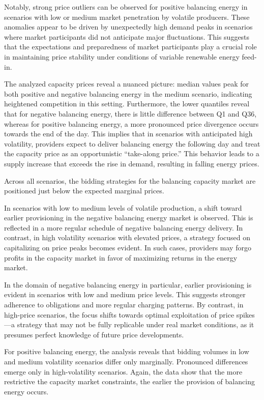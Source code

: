 Notably, strong price outliers can be observed for positive balancing energy in scenarios with low or medium market penetration
by volatile producers. These anomalies appear to be driven by unexpectedly high demand peaks in scenarios where market participants
did not anticipate major fluctuations. This suggests that the expectations and preparedness of market participants play a crucial
role in maintaining price stability under conditions of variable renewable energy feed-in.

The analyzed capacity prices reveal a nuanced picture: median values peak for both positive and negative balancing energy
in the medium scenario, indicating heightened competition in this setting.
Furthermore, the lower quantiles reveal that for
negative balancing energy, there is little difference between Q1 and Q36, whereas for positive balancing energy,
a more pronounced price divergence occurs towards the end of the day. This implies that in scenarios with anticipated high volatility,
providers expect to deliver balancing energy the following day and treat the capacity price as an opportunistic “take-along price.”
This behavior leads to a supply increase that exceeds the rise in demand, resulting in falling energy prices.

Across all scenarios, the bidding strategies for the balancing capacity market are positioned just below the expected marginal prices.

In scenarios with low to medium levels of volatile production, a shift toward earlier provisioning in the negative balancing energy
market is observed. This is reflected in a more regular schedule of negative balancing energy delivery. In contrast, in high volatility
scenarios with elevated prices, a strategy focused on capitalizing on price peaks becomes evident. In such cases, providers may forgo
profits in the capacity market in favor of maximizing returns in the energy market.

In the domain of negative balancing energy in particular, earlier provisioning is evident in scenarios with low and medium price levels.
This suggests stronger adherence to obligations and more regular charging patterns. By contrast, in high-price scenarios, the focus shifts towards optimal exploitation of price spikes—a strategy that may not be fully replicable under real market conditions, as it presumes perfect knowledge of future price developments.

For positive balancing energy, the analysis reveals that bidding volumes in low and medium volatility scenarios differ only marginally.
Pronounced differences emerge only in high-volatility scenarios. Again, the data show that the more restrictive the capacity market
constraints, the earlier the provision of balancing energy occurs.

